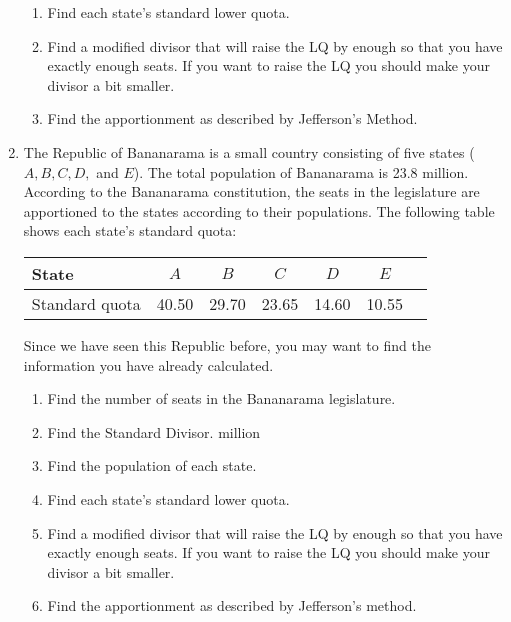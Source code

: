 \begin{enumerate}
\begin{enumerate}
	\normalsize
		\item Find each state's standard lower quota.
		\item Find a modified divisor that will raise the LQ by enough so that you have exactly enough seats.  If you want to raise the LQ you should make your divisor a bit smaller.
		\item Find the apportionment as described by Jefferson's Method.
	\end{enumerate} \vfill

\clearpage
	\item The Republic of Bananarama is  a small country consisting of five states ($A, B, C, D,$ and $E$).  The total population of Bananarama is 23.8 million.  According to the Bananarama constitution, the seats in the legislature are apportioned to the states according to their populations.  The following table shows each state's standard quota:
	
	\begin{center}
	\begin{tabular}{lcccccc}
State & $A$ & $B$ & $C$ & $D$ & $E$ \\\hline
Standard quota &40.50 & 29.70 & 23.65 & 14.60 & 10.55 \\\hline
\end{tabular}
\end{center}
Since we have seen this Republic before, you may want to find the information you have already calculated.
	\begin{enumerate}
	\item Find the number of seats in the Bananarama legislature.  \fi
	\item Find the Standard Divisor.  million \fi
	\item Find the population of each state. 
			\item Find each state's standard lower quota.
		\item Find a modified divisor that will raise the LQ by enough so that you have exactly enough seats.  If you want to raise the LQ you should make your divisor a bit smaller.
		\item Find the apportionment as described by Jefferson's method.


\end{enumerate}
\end{enumerate}
